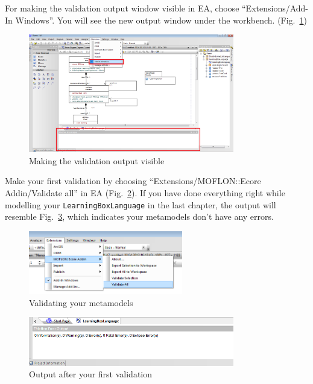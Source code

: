 For making the validation output window visible in EA, choose
``Extensions/Add-In Windows''. You will see the new output window under the
workbench. (Fig.~\ref{fig:validation_output})

\clearpage

\begin{figure}[htbp]
	\centering 
  \includegraphics[width=0.8\textwidth]{pics/memBoxBilder/memBox40} 
	\caption{Making the validation output visible}
	\label{fig:validation_output}
\end{figure}

Make your first validation by choosing ``Extensions/MOFLON::Ecore
Addin/Validate all'' in EA (Fig.~\ref{fig:validation_menu}). If you have done
everything right while modelling your \texttt{LearningBoxLanguage} in the last
chapter, the output will resemble Fig.~\ref{fig:first_validation}, which indicates your metamodels don't
have any errors.

\begin{figure}[htbp]
	\centering 
  \includegraphics[width=0.6\textwidth]{pics/memBoxBilder/memBox41} 
	\caption{Validating your metamodels}
	\label{fig:validation_menu}
\end{figure}

\begin{figure}[htbp]
	\centering 
  \includegraphics[width=0.8\textwidth]{pics/memBoxBilder/memBox42} 
	\caption{Output after your first validation}
	\label{fig:first_validation}
\end{figure}

